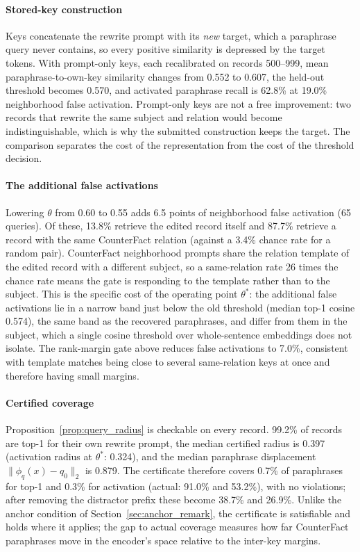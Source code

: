 \documentclass[preprint,12pt]{elsarticle}
\newif\ifmarkchanges
\newcommand{\rev}[1]{\ifmarkchanges{\color{blue}#1}\else#1\fi}
\begin{document}
\paragraph{Stored-key construction}
\rev{Keys concatenate the rewrite prompt with its \emph{new} target, which a paraphrase query never contains, so every positive similarity is depressed by the target tokens. With prompt-only keys, each recalibrated on records 500--999, mean paraphrase-to-own-key similarity changes from 0.552 to 0.607, the held-out threshold becomes 0.570, and activated paraphrase recall is 62.8\% at 19.0\% neighborhood false activation. Prompt-only keys are not a free improvement: two records that rewrite the same subject and relation would become indistinguishable, which is why the submitted construction keeps the target. The comparison separates the cost of the representation from the cost of the threshold decision.}

\paragraph{The additional false activations}
\rev{Lowering $\theta$ from 0.60 to 0.55 adds 6.5 points of neighborhood false activation (65 queries). Of these, 13.8\% retrieve the edited record itself and 87.7\% retrieve a record with the same CounterFact relation (against a 3.4\% chance rate for a random pair). CounterFact neighborhood prompts share the relation template of the edited record with a different subject, so a same-relation rate 26 times the chance rate means the gate is responding to the template rather than to the subject. This is the specific cost of the operating point $\theta^*$: the additional false activations lie in a narrow band just below the old threshold (median top-1 cosine 0.574), the same band as the recovered paraphrases, and differ from them in the subject, which a single cosine threshold over whole-sentence embeddings does not isolate. The rank-margin gate above reduces false activations to 7.0\%, consistent with template matches being close to several same-relation keys at once and therefore having small margins.}

\paragraph{Certified coverage}
\rev{Proposition~\ref{prop:query_radius} is checkable on every record. 99.2\% of records are top-1 for their own rewrite prompt, the median certified radius is 0.397 (activation radius at $\theta^*$: 0.324), and the median paraphrase displacement $\|\phi_q(x)-q_0\|_2$ is 0.879. The certificate therefore covers 0.7\% of paraphrases for top-1 and 0.3\% for activation (actual: 91.0\% and 53.2\%), with no violations; after removing the distractor prefix these become 38.7\% and 26.9\%. Unlike the anchor condition of Section~\ref{sec:anchor_remark}, the certificate is satisfiable and holds where it applies; the gap to actual coverage measures how far CounterFact paraphrases move in the encoder's space relative to the inter-key margins.}
\end{document}
